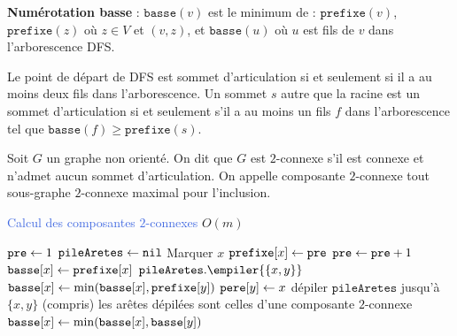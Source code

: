 \documentclass[a4paper,10pt,twocolumn]{article}
\begin{document}
	\begin{defn}
	\textbf{Numérotation basse} : $\texttt{basse}(v)$ est le minimum de : $\texttt{prefixe}(v)$, $\texttt{prefixe}(z)$ où $z \in V$ et $(v,z)$, et $\texttt{basse}(u)$ où $u$ est fils de $v$ dans l'arborescence DFS.
	\end{defn}

	\begin{thm}
	Le point de départ de DFS est sommet d'articulation si et seulement si il a au moins deux fils dans l'arborescence.
	Un sommet $s$ autre que la racine est un sommet d'articulation si et seulement s'il a au moins un fils $f$ dans l'arborescence tel que $\texttt{basse}(f) \geq \texttt{prefixe}(s)$.
	\end{thm}

	\begin{defn}
	Soit $G$ un graphe non orienté.
	On dit que $G$ est $2$-connexe s'il est connexe et n'admet aucun sommet d'articulation.
	On appelle composante $2$-connexe tout sous-graphe $2$-connexe maximal pour l'inclusion.
	\end{defn}

	\begin{algorithm}
	\caption{\textcolor{RoyalBlue}{Calcul des composantes $2$-connexes} $O(m)$}
	$\texttt{pre} \leftarrow 1$ \;
	$\texttt{pileAretes} \leftarrow \texttt{nil}$ \;
	{
		Marquer $x$ \;
		$\texttt{prefixe}[x] \leftarrow \texttt{pre}$ \;
		$\texttt{pre} \leftarrow \texttt{pre} + 1$ \;
		$\texttt{basse}[x] \leftarrow \texttt{prefixe}[x]$ \;
		{
			{
				$\texttt{pileAretes}.\empiler{ \{ x,y \} }$
				{
					$\texttt{basse}[x] \leftarrow \min(\texttt{basse}[x], \texttt{prefixe}[y])$ \;
				}
				\Sinon
				{
					$\texttt{pere}[y] \leftarrow x$ \;
					 \;
					{
						dépiler $\texttt{pileAretes}$ jusqu'à $\{ x,y \}$ (compris) \;
						les arêtes dépilées sont celles d'une composante $2$-connexe \;
					}
					\Sinon
					{
						$\texttt{basse}[x] \leftarrow \min(\texttt{basse}[x], \texttt{basse}[y])$ \;
					}
				}
			}
		}
	}
	\;
	\end{algorithm}
\end{document}
